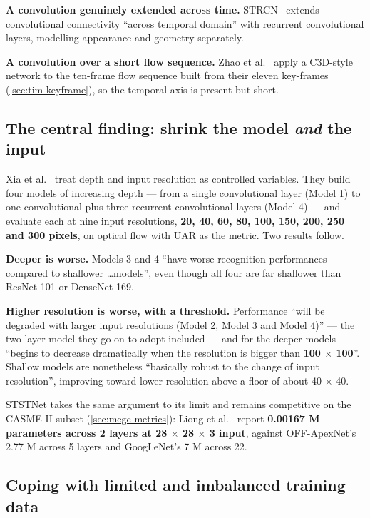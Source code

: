 \textbf{A convolution genuinely extended across time.} STRCN~\cite{xia2020a} extends convolutional connectivity ``across temporal domain'' with recurrent convolutional layers, modelling appearance and geometry separately.

\textbf{A convolution over a short flow sequence.} Zhao et al.~\cite{zhaoS2021} apply a C3D-style network to the ten-frame flow sequence built from their eleven key-frames (\autoref{sec:tim-keyframe}), so the temporal axis is present but short.

\subsection{The central finding: shrink the model \textit{and} the input}
\label{sec:cnn-shrink}

Xia et al.~\cite{xia2020b} treat depth and input resolution as controlled variables. They build four models of increasing depth --- from a single convolutional layer (Model 1) to one convolutional plus three recurrent convolutional layers (Model 4) --- and evaluate each at nine input resolutions, \textbf{20, 40, 60, 80, 100, 150, 200, 250 and 300 pixels}, on optical flow with UAR as the metric. Two results follow.

\textbf{Deeper is worse.} Models 3 and 4 ``have worse recognition performances compared to shallower \ldots models'', even though all four are far shallower than ResNet-101 or DenseNet-169.

\textbf{Higher resolution is worse, with a threshold.} Performance ``will be degraded with larger input resolutions (Model 2, Model 3 and Model 4)'' --- the two-layer model they go on to adopt included --- and for the deeper models ``begins to decrease dramatically when the resolution is bigger than \textbf{100 $\times$ 100}''. Shallow models are nonetheless ``basically robust to the change of input resolution'', improving toward lower resolution above a floor of about 40 $\times$ 40.

STSTNet takes the same argument to its limit and remains competitive on the CASME II subset (\autoref{sec:megc-metrics}): Liong et al.~\cite{liong2019b} report \textbf{0.00167 M parameters across 2 layers at 28 $\times$ 28 $\times$ 3 input}, against OFF-ApexNet's 2.77 M across 5 layers and GoogLeNet's 7 M across 22.

\subsection{Coping with limited and imbalanced training data}
\label{sec:cnn-limited-data}

